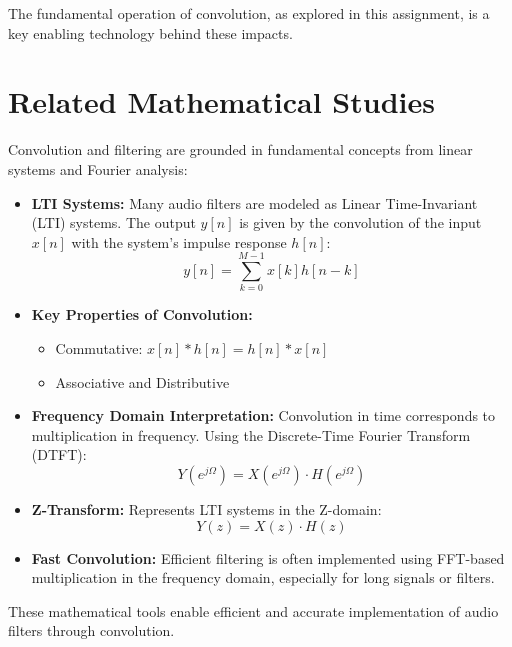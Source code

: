\documentclass[12pt, a4paper]{article}
\begin{document}
The fundamental operation of convolution, as explored in this assignment, is a key enabling technology behind these impacts.
\section{Related Mathematical Studies}
\label{sec:related_math_studies}

Convolution and filtering are grounded in fundamental concepts from linear systems and Fourier analysis:

\begin{itemize}
    \item \textbf{LTI Systems:} Many audio filters are modeled as Linear Time-Invariant (LTI) systems. The output $y[n]$ is given by the convolution of the input $x[n]$ with the system’s impulse response $h[n]$:
    \begin{equation}
        y[n] = \sum_{k=0}^{M-1} x[k]h[n-k]
    \end{equation}
    
    \item \textbf{Key Properties of Convolution:} 
    \begin{itemize}
        \item Commutative: $x[n] * h[n] = h[n] * x[n]$
        \item Associative and Distributive
    \end{itemize}
    
    \item \textbf{Frequency Domain Interpretation:} 
    Convolution in time corresponds to multiplication in frequency. Using the Discrete-Time Fourier Transform (DTFT):
    \begin{equation}
        Y(e^{j\Omega}) = X(e^{j\Omega}) \cdot H(e^{j\Omega})
    \end{equation}
    
    \item \textbf{Z-Transform:} Represents LTI systems in the Z-domain:
    \begin{equation}
        Y(z) = X(z) \cdot H(z)
    \end{equation}
    
    \item \textbf{Fast Convolution:} Efficient filtering is often implemented using FFT-based multiplication in the frequency domain, especially for long signals or filters.
\end{itemize}

These mathematical tools enable efficient and accurate implementation of audio filters through convolution.
\end{document}
